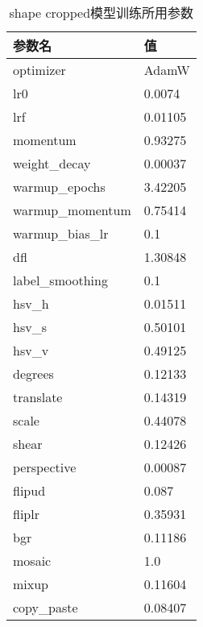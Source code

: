     \begin{table}
      \centering
    \begin{tabular}{ll}\toprule
       参数名&值\\\midrule
       optimizer&AdamW\\
       lr0&0.0074\\
       lrf&0.01105\\
       momentum&0.93275\\
       weight\_decay&0.00037\\
       warmup\_epochs&3.42205\\
       warmup\_momentum&0.75414\\
       warmup\_bias\_lr&0.1\\


       dfl&1.30848\\

     
       label\_smoothing&0.1\\
     
       hsv\_h&0.01511\\
       hsv\_s&0.50101\\
       hsv\_v&0.49125\\
       degrees&0.12133\\
       translate&0.14319\\
       scale&0.44078\\
       shear&0.12426\\
       perspective&0.00087\\
       flipud&0.087\\
       fliplr&0.35931\\
       bgr&0.11186\\
       mosaic&1.0\\
       mixup&0.11604\\
       copy\_paste&0.08407\\
       \bottomrule
      \end{tabular}
      \caption{shape cropped模型训练所用参数}
      \end{table}